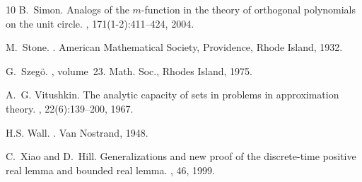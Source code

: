 \documentclass[12pt]{amsart}
\theoremstyle{definition}
\theoremstyle{remark}
\numberwithin{equation}{section}
\begin{document}
\begin{thebibliography}{10}
B.~Simon.
\newblock Analogs of the {$m$}-function in the theory of orthogonal polynomials
  on the unit circle.
, 171(1-2):411--424, 2004.

M.~Stone.
.
\newblock American {M}athematical {S}ociety, {P}rovidence, {R}hode {I}sland,
  1932.

G.~Szeg{\"{o}}.
, volume~23.
 Math. Soc., {Rhodes} Island, 1975.

A.~G. Vitushkin.
\newblock The analytic capacity of sets in problems in approximation theory.
, 22(6):139--200, 1967.

H.S. Wall.
.
\newblock Van {N}ostrand, 1948.

C.~Xiao and D.~Hill.
\newblock Generalizations and new proof of the discrete-time positive real
  lemma and bounded real lemma.
, 46, 1999.

\end{thebibliography}


%
\end{document}
